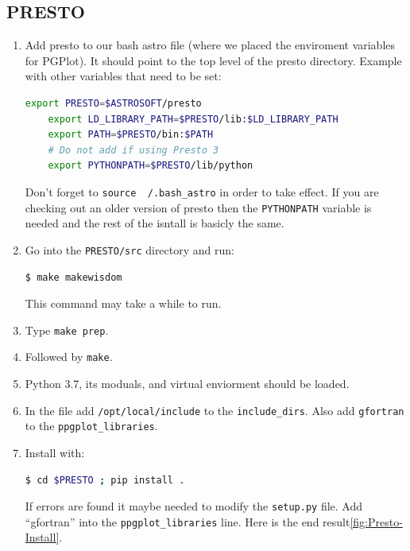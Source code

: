 \documentclass{article}
\begin{document}
\subsection{PRESTO}
\begin{enumerate}
    \item Add presto to our bash astro file (where we placed the enviroment variables for PGPlot). It should point to the top level of the presto directory. Example with other variables that need to be set: \begin{lstlisting}[language=bash]
    export PRESTO=$ASTROSOFT/presto
    export LD_LIBRARY_PATH=$PRESTO/lib:$LD_LIBRARY_PATH 
    export PATH=$PRESTO/bin:$PATH
    # Do not add if using Presto 3
    export PYTHONPATH=$PRESTO/lib/python 
    \end{lstlisting}
    Don't forget to \texttt{source ~/.bash\_astro} in order to take effect. If you are checking out an older version of presto then the \texttt{PYTHONPATH} variable is needed and the rest of the isntall is basicly the same.  
    \item Go into the \texttt{PRESTO/src} directory and run:  \begin{lstlisting}[language=bash]
    $ make makewisdom 
    \end{lstlisting}
    This command may take a while to run. 
    \item Type \texttt{make prep}.
    \item Followed by \texttt{make}.
    \item Python 3.7, its moduals, and virtual enviorment should be loaded.
    \item In the  file add \texttt{/opt/local/include} to the \texttt{include\_dirs}. Also add \texttt{gfortran} to the \texttt{ppgplot\_libraries}.
    \item Install with: \begin{lstlisting}[language=bash]     
    $ cd $PRESTO ; pip install .
        \end{lstlisting}
        If errors are found it maybe needed to modify the \texttt{setup.py} file. Add ``gfortran'' into the \texttt{ppgplot\_libraries} line. 
        Here is the end result\ref{fig:Presto-Install}. 
\begin{figure}

\end{figure}
\end{enumerate}
\end{document}
